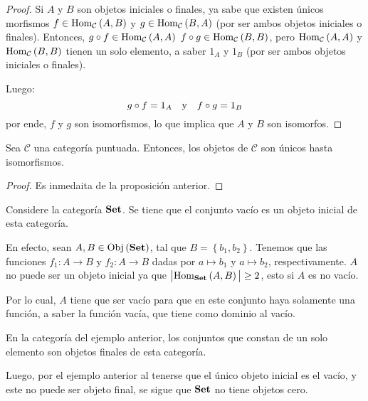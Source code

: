 \documentclass[12pt]{report}
\theoremstyle{largebreak}
\newcommand\abs[1]{\ensuremath{\big|#1\big|}}
\newcommand\cf[3]{\ensuremath{#1:#2\rightarrow#3}}
\newcommand{\Obj}[1]{\ensuremath{\textup{Obj}\left(#1\right)}}
\newcommand{\Hom}[3]{\ensuremath{\textup{Hom}_{#1}\left(#2,#3\right)}}
\newcommand{\Cat}[1]{\ensuremath{\textup{\textbf{#1}}}}
\begin{document}
    \begin{proof}
        Si $A$ y $B$ son objetos iniciales o finales, ya sabe que existen únicos morfismos $f\in\Hom{\mathcal{C}}{A}{B}$ y $g\in\Hom{\mathcal{C}}{B}{A}$ (por ser ambos objetos iniciales o finales). Entonces, $g\circ f\in \Hom{\mathcal{C}}{A}{A}$ $f\circ g\in \Hom{\mathcal{C}}{B}{B}$, pero $\Hom{\mathcal{C}}{A}{A}$ y $\Hom{\mathcal{C}}{B}{B}$ tienen un solo elemento, a saber $1_A$ y $1_B$ (por ser ambos objetos iniciales o finales).
        
        Luego:
        \begin{equation*}
            g\circ f =1_A\quad\textup{y}\quad f\circ g=1_B
        \end{equation*}
        por ende, $f$ y $g$ son isomorfismos, lo que implica que $A$ y $B$ son isomorfos.
    \end{proof}

    \begin{cor}
        Sea $\mathcal{C}$ una categoría puntuada. Entonces, los objetos de $\mathcal{C}$ son únicos hasta isomorfismos.
    \end{cor}

    \begin{proof}
        Es inmedaita de la proposición anterior.
    \end{proof}

    \begin{exa}
        Considere la categoría $\Cat{Set}$. Se tiene que el conjunto vacío es un objeto inicial de esta categoría.
    \end{exa}

    \begin{sol}
        En efecto, sean $A,B\in\Obj{\Cat{Set}}$, tal que $B=\left\{b_1,b_2 \right\}$. Tenemos que las funciones $\cf{f_1}{A}{B}$ y $\cf{f_2}{A}{B}$ dadas por $a\mapsto b_1$ y $a\mapsto b_2$, respectivamente. $A$ no puede ser un objeto inicial ya que $\abs{\Hom{\Cat{Set}}{A}{B}}\geq 2$, esto si $A$ es no vacío.

        Por lo cual, $A$ tiene que ser vacío para que en este conjunto haya solamente una función, a saber la función vacía, que tiene como dominio al vacío.
    \end{sol}

    \begin{exa}
        En la categoría del ejemplo anterior, los conjuntos que constan de un solo elemento son objetos finales de esta categoría.

        Luego, por el ejemplo anterior al tenerse que el único objeto inicial es el vacío, y este no puede ser objeto final, se sigue que $\Cat{Set}$ no tiene objetos cero.
    \end{exa}
\end{document}
